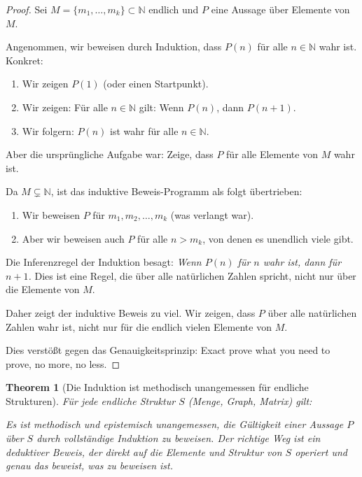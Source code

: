 \documentclass[12pt, a4paper]{article}
\newtheorem{theorem}{Theorem}[section]
\theoremstyle{definition}
\theoremstyle{remark}
\newcommand{\N}{\mathbb{N}}
\begin{document}
\begin{proof}
Sei $M = \{m_1, \ldots, m_k\} \subset \N$ endlich und $P$ eine Aussage über Elemente von $M$.

Angenommen, wir beweisen durch Induktion, dass $P(n)$ für alle $n \in \N$ wahr ist. Konkret:
\begin{enumerate}[label=(\roman*)]
  \item Wir zeigen $P(1)$ (oder einen Startpunkt).
  \item Wir zeigen: Für alle $n \in \N$ gilt: Wenn $P(n)$, dann $P(n+1)$.
  \item Wir folgern: $P(n)$ ist wahr für alle $n \in \N$.
\end{enumerate}

Aber die ursprüngliche Aufgabe war: Zeige, dass $P$ für alle Elemente von $M$ wahr ist.

Da $M \subsetneq \N$, ist das induktive Beweis-Programm als folgt übertrieben:
\begin{enumerate}[label=(\alph*)]
  \item Wir beweisen $P$ für $m_1, m_2, \ldots, m_k$ (was verlangt war).
  \item Aber wir beweisen auch $P$ für alle $n > m_k$, von denen es unendlich viele gibt.
\end{enumerate}

Die Inferenzregel der Induktion besagt: \textit{Wenn $P(n)$ für $n$ wahr ist, dann für $n+1$.} Dies ist eine Regel, die über alle natürlichen Zahlen spricht, nicht nur über die Elemente von $M$.

Daher zeigt der induktive Beweis zu viel. Wir zeigen, dass $P$ über alle natürlichen Zahlen wahr ist, nicht nur für die endlich vielen Elemente von $M$.

Dies verstößt gegen das Genauigkeitsprinzip: Exact prove what you need to prove, no more, no less.
\end{proof}

\begin{theorem}[Die Induktion ist methodisch unangemessen für endliche Strukturen]
\label{thm:induktion_unangemessen}
Für jede endliche Struktur $S$ (Menge, Graph, Matrix) gilt:

Es ist methodisch und epistemisch unangemessen, die Gültigkeit einer Aussage $P$ über $S$ durch vollständige Induktion zu beweisen. Der richtige Weg ist ein \emph{deduktiver Beweis}, der direkt auf die Elemente und Struktur von $S$ operiert und genau das beweist, was zu beweisen ist.
\end{theorem}
\end{document}
